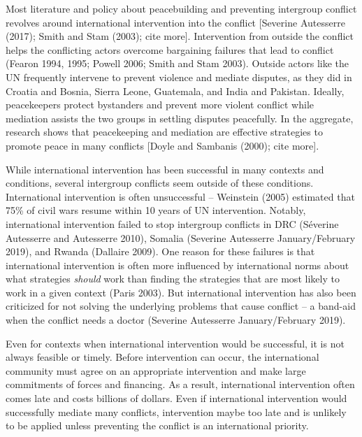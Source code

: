 \documentclass[11pt]{article}
\begin{document}
Most literature and policy about peacebuilding and preventing intergroup
conflict revolves around international intervention into the conflict
{[}Severine Autesserre (2017); Smith and Stam (2003); cite more{]}.
Intervention from outside the conflict helps the conflicting actors
overcome bargaining failures that lead to conflict (Fearon 1994, 1995;
Powell 2006; Smith and Stam 2003). Outside actors like the UN frequently
intervene to prevent violence and mediate disputes, as they did in
Croatia and Bosnia, Sierra Leone, Guatemala, and India and Pakistan.
Ideally, peacekeepers protect bystanders and prevent more violent
conflict while mediation assists the two groups in settling disputes
peacefully. In the aggregate, research shows that peacekeeping and
mediation are effective strategies to promote peace in many conflicts
{[}Doyle and Sambanis (2000); cite more{]}.

While international intervention has been successful in many contexts
and conditions, several intergroup conflicts seem outside of these
conditions. International intervention is often unsuccessful --
Weinstein (2005) estimated that 75\% of civil wars resume within 10
years of UN intervention. Notably, international intervention failed to
stop intergroup conflicts in DRC (Séverine Autesserre and Autesserre
2010), Somalia (Severine Autesserre January/February 2019), and Rwanda
(Dallaire 2009). One reason for these failures is that international
intervention is often more influenced by international norms about what
strategies \emph{should} work than finding the strategies that are most
likely to work in a given context (Paris 2003). But international
intervention has also been criticized for not solving the underlying
problems that cause conflict -- a band-aid when the conflict needs a
doctor (Severine Autesserre January/February 2019).

Even for contexts when international intervention would be successful,
it is not always feasible or timely. Before intervention can occur, the
international community must agree on an appropriate intervention and
make large commitments of forces and financing. As a result,
international intervention often comes late and costs billions of
dollars. Even if international intervention would successfully mediate
many conflicts, intervention maybe too late and is unlikely to be
applied unless preventing the conflict is an international priority.
\end{document}
